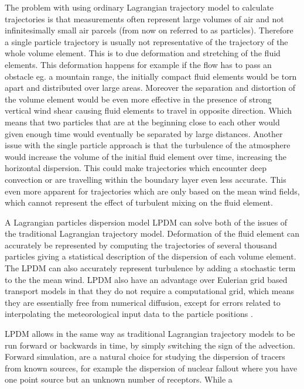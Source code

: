The problem with using ordinary Lagrangian trajectory model to calculate trajectories is that measurements 
often represent large volumes of air and not infinitesimally small air parcels (from now on referred to as 
particles). Therefore a single particle trajectory is usually not representative of the trajectory of the 
whole volume element. This is to due deformation and stretching of the fluid elements. This deformation 
happens for example if the flow has to pass an obstacle eg. a mountain range, the initially compact fluid 
elements would be torn apart and distributed over large areas. Moreover the separation and distortion of the
volume element would be even more effective in the presence of strong vertical wind shear causing fluid 
elements to travel in opposite direction. Which means that two particles that are at the beginning close to 
each other would given enough time would eventually be separated by large distances. Another issue with the 
single particle approach is that the turbulence of the atmosphere would increase the volume of the initial 
fluid element over time, increasing the horizontal dispersion. This could make trajectories which encounter 
deep convection or are travelling within the boundary layer even less accurate. This even more apparent for 
trajectories which are only based on the mean wind fields, which cannot represent the effect of turbulent 
mixing on the fluid element. \par A Lagrangian particles dispersion model LPDM can solve both of the issues 
of the traditional Lagrangian trajectory model. Deformation of the fluid element can accurately be 
represented by computing the trajectories of several thousand particles giving a statistical description of 
the dispersion of each volume element. The LPDM can also accurately represent turbulence by adding a 
stochastic term to the the mean wind. 
LPDM also have an advantage over Eulerian grid based transport models in that they do not require a 
computational grid, which means they are essentially free from numerical diffusion, except for errors 
related to interpolating the meteorological input data to the particle positions 
\parencite{cassiani_offline_2016}. \par LPDM allows in the same way as traditional Lagrangian trajectory 
models to be run forward or backwards in time, by simply switching the sign of the advection. Forward 
simulation, are a natural choice for studying the dispersion of tracers from known sources, for example the 
dispersion of nuclear fallout where you have one point source but an unknown number of receptors. While a 
